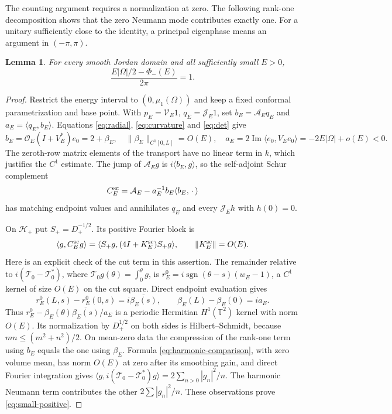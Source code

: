 \documentclass[11pt]{amsart}
\numberwithin{equation}{section}
\newtheorem{lemma}{Lemma}[section]
\newcommand{\T}{\mathbb T}
\newcommand{\OO}{\mathcal O}
\newcommand{\TT}{\mathcal T}
\newcommand{\Aop}{\mathcal A}
\newcommand{\JJ}{\mathcal J}
\newcommand{\VV}{\mathcal V}
\newcommand{\ip}[2]{\langle #1,#2\rangle}
\newcommand{\norm}[1]{\lVert #1\rVert}
\begin{document}
The counting argument requires a normalization at zero. The following
rank-one decomposition shows that the zero Neumann mode contributes
exactly one. For a unitary sufficiently close to the identity, a
principal eigenphase means an argument in $(-\pi,\pi)$.

\begin{lemma}\label{lem:initial}
For every smooth Jordan domain and all sufficiently small $E>0$,
\begin{equation}\label{eq:initial}
 \frac{E|\Omega|/2-\Phi_-(E)}{2\pi}=1.
\end{equation}
\end{lemma}
\begin{proof}
Restrict the energy interval to $(0,\mu_1(\Omega))$ and keep a fixed
conformal parametrization and base point. With $p_E=\VV_E1$, $q_E=\JJ_E1$, set
$b_E=\Aop_Eq_E$ and $a_E=\ip{q_E}{b_E}$. Equations
\eqref{eq:radial}, \eqref{eq:curvature} and \eqref{eq:det} give
\[
 b_E=\OO_E(I+V_E^*)e_0=2+\beta_E,\quad
 \norm{\beta_E}_{C^1[0,L]}=O(E),\quad
 a_E=2\operatorname{Im}\ip{e_0}{V_Ee_0}
           =-2E|\Omega|+o(E)<0.
\]
The zeroth-row matrix elements of the transport have no linear term in
$k$, which justifies the $C^1$ estimate. The jump of $\Aop_Eg$ is
$i\ip{b_E}g$, so the self-adjoint Schur complement
\begin{equation}\label{eq:small-Schur}
 C_E^{\rm sc}=\Aop_E-a_E^{-1}b_E\ip{b_E}{\,\cdot\,}
\end{equation}
has matching endpoint values and annihilates $q_E$ and every
$\JJ_Eh$ with $h(0)=0$.

On $\mathcal H_+$ put $S_+=D_+^{-1/2}$. Its positive Fourier block is
\begin{equation}\label{eq:small-positive}
 \ip g{C_E^{\rm sc}g}
      =\ip{S_+g}{(4I+K_E^{\rm sc})S_+g},\qquad
 \norm{K_E^{\rm sc}}=O(E).
\end{equation}
Here is an explicit check of the cut term in this assertion. The
remainder relative to $i(\TT_0-\TT_0^*)$, where
$\TT_0g(\theta)=\int_0^\theta g$, is
$r_E^0=i\operatorname{sgn}(\theta-s)(w_E-1)$, a $C^1$ kernel of size
$O(E)$ on the cut square. Direct endpoint evaluation gives
\[
 r_E^0(L,s)-r_E^0(0,s)=i\overline{\beta_E(s)},\qquad
 \beta_E(L)-\beta_E(0)=ia_E.
\]
Thus $r_E^0-\beta_E(\theta)\overline{\beta_E(s)}/a_E$ is a periodic
Hermitian $H^1(\T^2)$ kernel with norm $O(E)$. Its normalization by
$D_+^{1/2}$ on both sides is Hilbert--Schmidt, because
$mn\le(m^2+n^2)/2$. On mean-zero data the compression of the rank-one
term using $b_E$ equals the one using $\beta_E$. Formula
\eqref{eq:harmonic-comparison}, with zero volume mean, has norm $O(E)$
at zero after its smoothing gain, and direct Fourier integration gives
$\ip g{i(\TT_0-\TT_0^*)g}=2\sum_{n>0}|g_n|^2/n$.
The harmonic Neumann term contributes the other $2\sum|g_n|^2/n$.
These observations prove \eqref{eq:small-positive}.


\end{proof}
\end{document}
